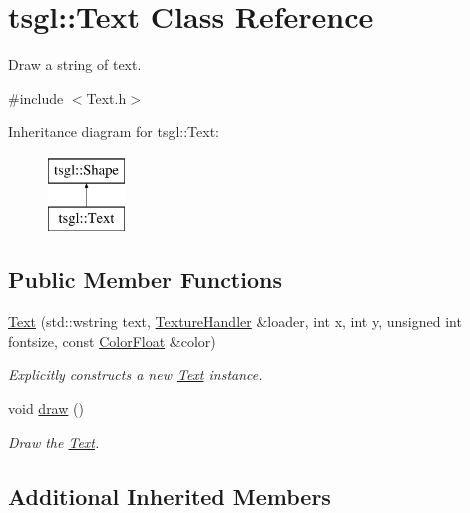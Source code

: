 \hypertarget{classtsgl_1_1_text}{\section{tsgl\-:\-:Text Class Reference}
\label{classtsgl_1_1_text}
}


Draw a string of text.  




{\ttfamily \#include $<$Text.\-h$>$}

Inheritance diagram for tsgl\-:\-:Text\-:\begin{figure}[H]
\begin{center}
\leavevmode
\includegraphics[height=2.000000cm]{classtsgl_1_1_text}
\end{center}
\end{figure}
\subsection*{Public Member Functions}
\begin{DoxyCompactItemize}
\item 
\hyperlink{classtsgl_1_1_text_ad1a6a77a4762f4420527457a7a5c24e7}{Text} (std\-::wstring text, \hyperlink{classtsgl_1_1_texture_handler}{Texture\-Handler} \&loader, int x, int y, unsigned int fontsize, const \hyperlink{structtsgl_1_1_color_float}{Color\-Float} \&color)
\begin{DoxyCompactList}\small\item\em Explicitly constructs a new \hyperlink{classtsgl_1_1_text}{Text} instance. \end{DoxyCompactList}\item 
void \hyperlink{classtsgl_1_1_text_a9dc47e4af682abfdab74e37b71f9fbde}{draw} ()
\begin{DoxyCompactList}\small\item\em Draw the \hyperlink{classtsgl_1_1_text}{Text}. \end{DoxyCompactList}\end{DoxyCompactItemize}
\subsection*{Additional Inherited Members}


